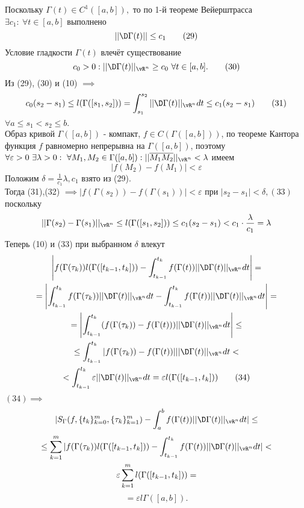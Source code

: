 \documentclass[main]{subfiles}
\begin{document}
\begin{longProof} Поскольку $\Gamma(t)\in C^1([a,b]),$ то по 1-й теореме Вейерштрасса $\exists c_1:\ \forall t\in [a,b]$ выполнено
    \[ ||\D\Gamma(t)||\leq c_1\tag{29} \]
    Условие гладкости $\Gamma(t)$ влечёт существование
    \[c_0>0: ||\D\Gamma(t)||_{\vR^n}\geq c_0\ \forall t\in [a,b].\tag{30}\]
    Из (29), (30) и (10) $\implies$ \[ c_0(s_2-s_1)\leq l(\Gamma([s_1,s_2]))=\int_{s_1}^{s_2} ||\D\Gamma(t)||_{\vR^n} dt\leq c_1(s_2-s_1)\tag{31} \]
    \( \forall a\leq s_1<s_2\leq b. \)\\
    Образ кривой $\Gamma([a,b])$ - компакт, $f\in C(\Gamma([a,b]))$, по теореме Кантора функция $f$ равномерно непрерывна на $\Gamma([a,b])$, поэтому $\forall \varepsilon>0\ \exists\lambda>0:\ \forall M_1, M_2\in\Gamma([a,b]): ||\overline{M_1M_2}||_{\vR^n}<\lambda$ имеем \[ |f(M_2)-f(M_1)|<\varepsilon\tag{32} \]
    Положим $\delta=\frac{1}{c_1}\lambda, c_1$ взято из (29).\\ Тогда (31),(32) $\implies |f(\Gamma(s_2))-f(\Gamma(s_1))|<\varepsilon$ при $|s_2-s_1|<\delta, (33)$ поскольку
    \[ ||\Gamma(s_2)-\Gamma(s_1)||_{\vR^n}\leq l(\Gamma([s_1,s_2]))\leq c_1(s_2-s_1)<c_1\cdot\frac{\lambda}{c_1}=\lambda \]
    Теперь (10) и (33) при выбранном $\delta$ влекут
    \begin{multline*} \left|f(\Gamma(\tau_k))l(\Gamma([t_{k-1},t_k]))-\int_{t_{k-1}}^{t_k} f(\Gamma(t))||\D\Gamma(t)||_{\vR^n} dt\right|= \\
        =\left|\int_{t_{k-1}}^{t_k} f(\Gamma(\tau_k))||\D\Gamma(t)||_{\vR^n} dt - \int_{t_{k-1}}^{t_k} f(\Gamma(t))||\D\Gamma(t)||_{\vR^n} dt\right|= \\
        =\left|\int_{t_{k-1}}^{t_k} (f(\Gamma(\tau_k))-f(\Gamma(t)))||\D\Gamma(t)||_{\vR^n} dt\right| \leq \\
        \leq \int_{t_{k-1}}^{t_k} |f(\Gamma(\tau_k))-f(\Gamma(t))|||\D\Gamma(t)||_{\vR^n} dt< \\
        <\int_{t_{k-1}}^{t_k} \varepsilon||\D\Gamma(t)||_{\vR^n} dt=\varepsilon l(\Gamma([t_{k-1},t_k]))\tag{34} \end{multline*}
    $(34)\implies$ \[ |S_\Gamma(f,\{t_k\}^m_{k=0},\{\tau_k\}^m_{k=1})-\int_a^b f(\Gamma(t))||\D\Gamma(t)||_{\vR^n} dt|\leq \]
    \begin{multline*}
        \leq \sum\limits_{k=1}^m |f(\Gamma(\tau_k)) l(\Gamma([t_{k-1},t_k]))-\int_{t_{k-1}}^{t_k} f(\Gamma(t))||\D\Gamma(t)||_{\vR^n} dt|< \\
        \varepsilon\sum\limits_{k=1}^m l(\Gamma([t_{k-1},t_k]))=
    \end{multline*}
    \[ =\varepsilon l\Gamma([a,b]). \]
\end{longProof}
\end{document}
